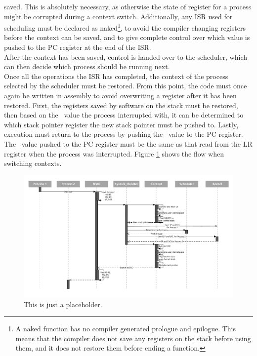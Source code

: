 saved. This is absolutely necessary, as otherwise the state of register for a
process might be corrupted during a context switch. Additionally, any ISR used
for scheduling must be declared as naked\footnote{A naked function has no
compiler generated prologue and epilogue. This means that the compiler does not
save any registers on the stack before using them, and it does not restore them
before ending a function.}, to avoid the compiler changing registers before the
context can be saved, and to give complete control over which value is pushed to
the PC register at the end of the ISR.\\
After the context has been saved, control is handed over to the scheduler, which
can then decide which process should be running next.\\
Once all the operations the ISR has completed, the context of the process
selected by the scheduler must be restored. From this point, the code must once
again be written in assembly to avoid overwriting a register after it has been 
restored. First, the registers saved by software on the stack must be restored,
then based on the \excreturn\ value the process interrupted with, it can be 
determined to which stack pointer register the new stack pointer must be pushed
to. Lastly, execution must return to the process by pushing the \excreturn\ value
to the PC register. The \excreturn\ value pushed to the PC register must be the
same as that read from the LR register when the process was interrupted.
Figure \ref{fig:scheduling_sequence_diagram} shows the flow when switching contexts.
\begin{figure}
    \includegraphics[width=\textwidth]{figures/scheduling_sequence_diagram.pdf}
    \caption{This is just a placeholder.}
    \label{fig:scheduling_sequence_diagram}
\end{figure}

